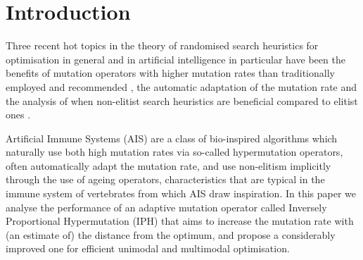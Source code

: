 \documentclass[lettersize,journal]{IEEEtran}
\begin{document}
\section{Introduction}
Three recent hot topics in the theory of randomised search heuristics for optimisation in general and in artificial intelligence in particular have been the benefits of mutation operators with higher mutation rates than traditionally employed and recommended \cite{FQWGECCO18,FGQWPPSN18,CorusOlivetoYazdani2021TEVC,DoerrGECCO2017FastGA,CorusOlivetoTEVCsteadyGA2017,JumpTEVC2017,CorusOlivetoGecco2019,OlivetoSudholtWitt2020,DoerrDoerrEbel2015,LenglerTEVC2019}, the automatic adaptation of the mutation rate \cite{DoerrDoerrBookChapter,DLOW2018,DoerrEtAl2016B,LissovoiEtAl2020ECJ,LOWAAAI2020} and the analysis of when non-elitist search heuristics are beneficial compared to elitist ones \cite{OlivetoPaizJorgeSudholt2017Algorithmica,LissovoiOlivetoWarwicker2019AAAI,Lehr2021AAAI,DoerrComma2020,CaseLehreTEVC,DangJansenLehreGECCO2015,DangLehreFOGA2015,LenglerSchillerSieberling2024,HeviaSudholtAlgo24}. 

Artificial Immune Systems (AIS) are a class of bio-inspired algorithms which naturally use both high mutation rates via so-called hypermutation operators, often automatically adapt the mutation rate,  and use non-elitism implicitly through the use of ageing operators, characteristics that are typical in the immune system of vertebrates from which AIS draw inspiration. In this paper we analyse the performance of an adaptive mutation operator called Inversely Proportional Hypermutation (IPH) that aims to increase the mutation rate with (an estimate of) the distance from the optimum, and propose a considerably improved one for efficient unimodal and multimodal optimisation.
\end{document}
